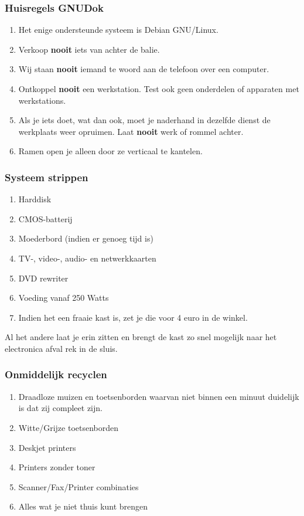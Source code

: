 \documentclass[a4paper, handout]{beamer}
\begin{document}
\begin{frame}
	\frametitle{Huisregels GNUDok}
	\begin{enumerate}
		\item{Het enige ondersteunde systeem is Debian GNU/Linux.}
		\item{Verkoop \textbf{nooit} iets van achter de balie.}
		\item{Wij staan \textbf{nooit} iemand te woord aan de telefoon over een computer.}
		\item{Ontkoppel \textbf{nooit} een werkstation. Test ook geen onderdelen of apparaten met werkstations.}
		\item{Als je iets doet, wat dan ook, moet je naderhand in dezelfde dienst de werkplaats weer opruimen. Laat \textbf{nooit} werk of rommel achter.}
		\item{Ramen open je alleen door ze verticaal te kantelen.}
	\end{enumerate}
\end{frame}

\begin{frame}
	\frametitle{Systeem strippen}
	\begin{enumerate}
		\item{Harddisk}
		\item{CMOS-batterij}
		\item{Moederbord (indien er genoeg tijd is)}
		\item{TV-, video-, audio- en netwerkkaarten}
		\item{DVD rewriter}
		\item{Voeding vanaf 250 Watts}
		\item{Indien het een fraaie kast is, zet je die voor 4 euro in de winkel.}
	\end{enumerate}
	Al het andere laat je erin zitten en brengt de kast zo snel mogelijk naar het electronica afval rek in de sluis. 
\end{frame}

\begin{frame}
	\frametitle{Onmiddelijk recyclen}
	\begin{enumerate}
		\item{Draadloze muizen en toetsenborden waarvan niet binnen een minuut duidelijk is dat zij compleet zijn.}
		\item{Witte/Grijze toetsenborden}
		\item{Deskjet printers}
		\item{Printers zonder toner}
		\item{Scanner/Fax/Printer combinaties}
		\item{Alles wat je niet thuis kunt brengen}
	\end{enumerate}
\end{frame}
\end{document}
